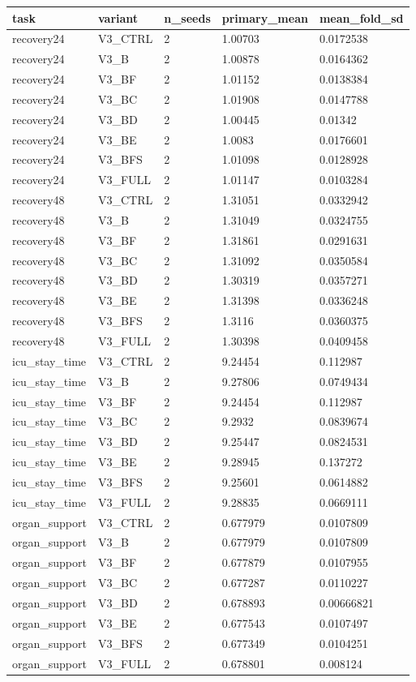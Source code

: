 \begin{tabular}{lllll}
\hline
task & variant & n\_seeds & primary\_mean & mean\_fold\_sd \\
\hline
recovery24 & V3\_CTRL & 2 & 1.00703 & 0.0172538 \\
recovery24 & V3\_B & 2 & 1.00878 & 0.0164362 \\
recovery24 & V3\_BF & 2 & 1.01152 & 0.0138384 \\
recovery24 & V3\_BC & 2 & 1.01908 & 0.0147788 \\
recovery24 & V3\_BD & 2 & 1.00445 & 0.01342 \\
recovery24 & V3\_BE & 2 & 1.0083 & 0.0176601 \\
recovery24 & V3\_BFS & 2 & 1.01098 & 0.0128928 \\
recovery24 & V3\_FULL & 2 & 1.01147 & 0.0103284 \\
recovery48 & V3\_CTRL & 2 & 1.31051 & 0.0332942 \\
recovery48 & V3\_B & 2 & 1.31049 & 0.0324755 \\
recovery48 & V3\_BF & 2 & 1.31861 & 0.0291631 \\
recovery48 & V3\_BC & 2 & 1.31092 & 0.0350584 \\
recovery48 & V3\_BD & 2 & 1.30319 & 0.0357271 \\
recovery48 & V3\_BE & 2 & 1.31398 & 0.0336248 \\
recovery48 & V3\_BFS & 2 & 1.3116 & 0.0360375 \\
recovery48 & V3\_FULL & 2 & 1.30398 & 0.0409458 \\
icu\_stay\_time & V3\_CTRL & 2 & 9.24454 & 0.112987 \\
icu\_stay\_time & V3\_B & 2 & 9.27806 & 0.0749434 \\
icu\_stay\_time & V3\_BF & 2 & 9.24454 & 0.112987 \\
icu\_stay\_time & V3\_BC & 2 & 9.2932 & 0.0839674 \\
icu\_stay\_time & V3\_BD & 2 & 9.25447 & 0.0824531 \\
icu\_stay\_time & V3\_BE & 2 & 9.28945 & 0.137272 \\
icu\_stay\_time & V3\_BFS & 2 & 9.25601 & 0.0614882 \\
icu\_stay\_time & V3\_FULL & 2 & 9.28835 & 0.0669111 \\
organ\_support & V3\_CTRL & 2 & 0.677979 & 0.0107809 \\
organ\_support & V3\_B & 2 & 0.677979 & 0.0107809 \\
organ\_support & V3\_BF & 2 & 0.677879 & 0.0107955 \\
organ\_support & V3\_BC & 2 & 0.677287 & 0.0110227 \\
organ\_support & V3\_BD & 2 & 0.678893 & 0.00666821 \\
organ\_support & V3\_BE & 2 & 0.677543 & 0.0107497 \\
organ\_support & V3\_BFS & 2 & 0.677349 & 0.0104251 \\
organ\_support & V3\_FULL & 2 & 0.678801 & 0.008124 \\
\hline
\end{tabular}
